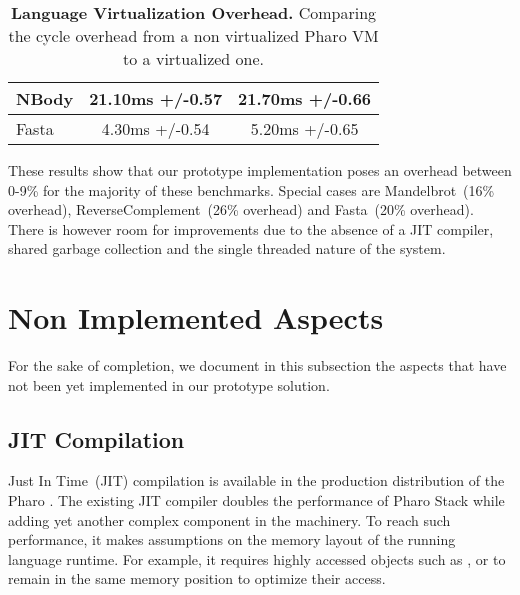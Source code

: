 \begin{table}[ht]
\begin{tabular}{|l|c|c|}
		NBody & 21.10ms +/-0.57 & 21.70ms +/-0.66 \\\hline%
		Fasta & 4.30ms +/-0.54 & 5.20ms +/-0.65 \\\hline%
 	\end{tabular}
	\vspace*{0.2cm}
 	\caption{\small\textbf{Language Virtualization Overhead.} Comparing the cycle overhead from a non virtualized Pharo VM to a virtualized one.\label{tb:benchmarks}}
 \end{table}

These results show that our prototype implementation poses an overhead between 0-9\% for the majority of these benchmarks. Special cases are Mandelbrot~(16\% overhead), ReverseComplement~(26\% overhead) and Fasta~(20\% overhead).
There is however room for improvements due to the absence of a JIT compiler, shared garbage collection and the single threaded nature of the system.


\section{Non Implemented Aspects} \label{sec:not_yet_implemented}
 
For the sake of completion, we document in this subsection the aspects that have not been yet implemented in our prototype solution.

\subsection{JIT Compilation}

Just In Time~(JIT) compilation is available in the production distribution of the Pharo \VM. The existing JIT compiler doubles the performance of Pharo Stack \VM while adding yet another complex component in the \VM machinery. To reach such performance, it makes assumptions on the memory layout of the running language runtime. For example, it requires highly accessed objects such as ,  or  to remain in the same memory position to optimize their access.

